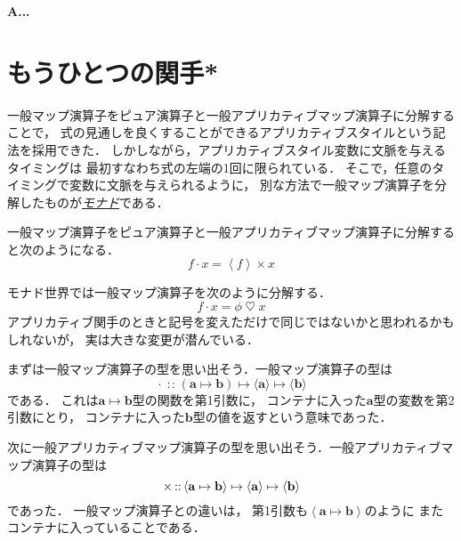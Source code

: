 \documentclass[a5paper,draft]{jsbook}
\newenvironment{leader}{\begingroup\bf}{\endgroup}
\newcommand{\keyword}[1]{{\underline{\emph{#1}}}}
\newcommand{\mathTypeParameter}[1]{\mathbf{#1}}
\newcommand{\mathPureWith}[1]{\left\langle#1\right\rangle}
\newcommand{\mathBinaryOperator}[1]{\operatorname{#1}}
\newcommand{\mathApplicativeGeneralMap}{\times}
\newcommand{\mathGeneralMap}{\mathBinaryOperator{\cdot}}
\newcommand{\mathIn}{\mathBinaryOperator{:\!:}}
\newcommand{\mathMonadGeneralMap}{\mathBinaryOperator{\heartsuit}}
\newcommand{\mathMapsTo}{\mapsto}
\newcommand{\mathMorph}[2]{#1\mathMapsTo#2}
\newcommand{\mathMorphII}[3]{#1\mathMapsTo#2\mathMapsTo#3}
\begin{document}
\begin{leader}
A...
\end{leader}


\section{もうひとつの関手*}


一般マップ演算子をピュア演算子と一般アプリカティブマップ演算子に分解することで，
式の見通しを良くすることができるアプリカティブスタイルという記法を採用できた．
しかしながら，アプリカティブスタイル変数に文脈を与えるタイミングは
最初すなわち式の左端の1回に限られている．
そこで，任意のタイミングで変数に文脈を与えられるように，
別な方法で一般マップ演算子を分解したものが\keyword{モナド}である．

一般マップ演算子をピュア演算子と一般アプリカティブマップ演算子に分解すると次のようになる．
\begin{equation}
f\mathGeneralMap x=\mathPureWith{f}\mathApplicativeGeneralMap x
\end{equation}

モナド世界では一般マップ演算子を次のように分解する．
\begin{equation}
f\mathGeneralMap x=\phi\mathMonadGeneralMap x
\end{equation}
アプリカティブ関手のときと記号を変えただけで同じではないかと思われるかもしれないが，
実は大きな変更が潜んでいる．

まずは一般マップ演算子の型を思い出そう．一般マップ演算子の型は
\begin{equation}
\mathGeneralMap
\mathIn{}\mathMorphII{(\mathMorph{\mathTypeParameter{a}}{\mathTypeParameter{b}})}{\langle\mathTypeParameter{a}\rangle}{\langle\mathTypeParameter{b}\rangle}
\end{equation}
である．
これは$\mathTypeParameter{a}\mapsto\mathTypeParameter{b}$型の関数を第1引数に，
コンテナに入った$\mathTypeParameter{a}$型の変数を第2引数にとり，
コンテナに入った$\mathTypeParameter{b}$型の値を返すという意味であった．

次に一般アプリカティブマップ演算子の型を思い出そう．一般アプリカティブマップ演算子の型は
\begin{equation}
\mathApplicativeGeneralMap
\mathIn{}\mathMorphII{\langle\mathMorph{\mathTypeParameter{a}}{\mathTypeParameter{b}}\rangle}{\langle\mathTypeParameter{a}\rangle}{\langle\mathTypeParameter{b}\rangle}\\
\end{equation}
であった．
一般マップ演算子との違いは，
第1引数も$\mathPureWith{\mathTypeParameter{a}\mapsto\mathTypeParameter{b}}$のように
またコンテナに入っていることである．
\end{document}
